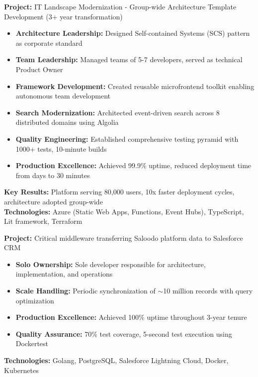 \documentclass[11pt,a4paper,sans]{moderncv}
\begin{document}
\vspace{5pt}

{
\textbf{Project:} IT Landscape Modernization - Group-wide Architecture Template Development (3+ year transformation)
\begin{itemize}[noitemsep,topsep=5pt]
\item \textbf{Architecture Leadership:} Designed Self-contained Systems (SCS) pattern as corporate standard
\item \textbf{Team Leadership:} Managed teams of 5-7 developers, served as technical Product Owner
\item \textbf{Framework Development:} Created reusable microfrontend toolkit enabling autonomous team development
\item \textbf{Search Modernization:} Architected event-driven search across 8 distributed domains using Algolia
\item \textbf{Quality Engineering:} Established comprehensive testing pyramid with 1000+ tests, 10-minute builds
\item \textbf{Production Excellence:} Achieved 99.9\% uptime, reduced deployment time from days to 30 minutes
\end{itemize}
\textbf{Key Results:} Platform serving 80,000 users, 10x faster deployment cycles, architecture adopted group-wide\\
\textbf{Technologies:} Azure (Static Web Apps, Functions, Event Hubs), TypeScript, Lit framework, Terraform
}

\vspace{5pt}

{
\textbf{Project:} Critical middleware transferring Saloodo platform data to Salesforce CRM
\begin{itemize}[noitemsep,topsep=5pt]
\item \textbf{Solo Ownership:} Sole developer responsible for architecture, implementation, and operations
\item \textbf{Scale Handling:} Periodic synchronization of $\sim$10 million records with query optimization
\item \textbf{Production Excellence:} Achieved 100\% uptime throughout 3-year tenure
\item \textbf{Quality Assurance:} 70\% test coverage, 5-second test execution using Dockertest
\end{itemize}
\textbf{Technologies:} Golang, PostgreSQL, Salesforce Lightning Cloud, Docker, Kubernetes
}
\end{document}
